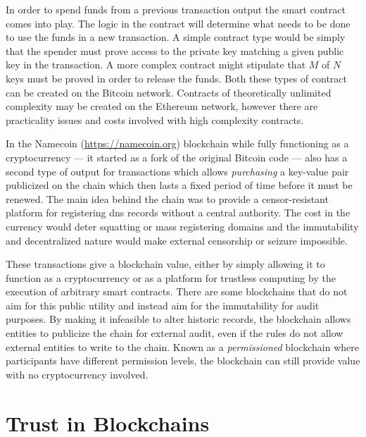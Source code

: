 In order to spend funds from a previous transaction output the smart contract comes into play. The logic in the contract will determine what needs to be done to use the funds in a new transaction. A simple contract type would be simply that the spender must prove access to the private key matching a given public key in the transaction. A more complex contract might stipulate that $M$ of $N$ keys must be proved in order to release the funds. Both these types of contract can be created on the Bitcoin network. Contracts of theoretically unlimited complexity may be created on the Ethereum network, however there are practicality issues and costs involved with high complexity contracts.


In the Namecoin (\url{https://namecoin.org}) blockchain while fully functioning as a cryptocurrency --- it started as a fork of the original Bitcoin code --- also has a second type of output for transactions which allows \emph{purchasing} a key-value pair publicized on the chain which then lasts a fixed period of time before it must be renewed. The main idea behind the chain was to provide a censor-resistant platform for registering \gls{dns} records without a central authority. The cost in the currency would deter squatting or mass registering domains and the immutability and decentralized nature would make external censorship or seizure impossible.

These transactions give a blockchain value, either by simply allowing it to function as a cryptocurrency or as a platform for trustless computing by the execution of arbitrary smart contracts. There are some blockchains that do not aim for this public utility and instead aim for the immutability for audit purposes. By making it infeasible to alter historic records, the blockchain allows entities to publicize the chain for external audit, even if the rules do not allow external entities to write to the chain. Known as a \emph{permissioned} blockchain where participants have different permission levels, the blockchain can still provide value with no cryptocurrency involved.

\section{Trust in Blockchains}
\label{ch:blockchain:trust}

